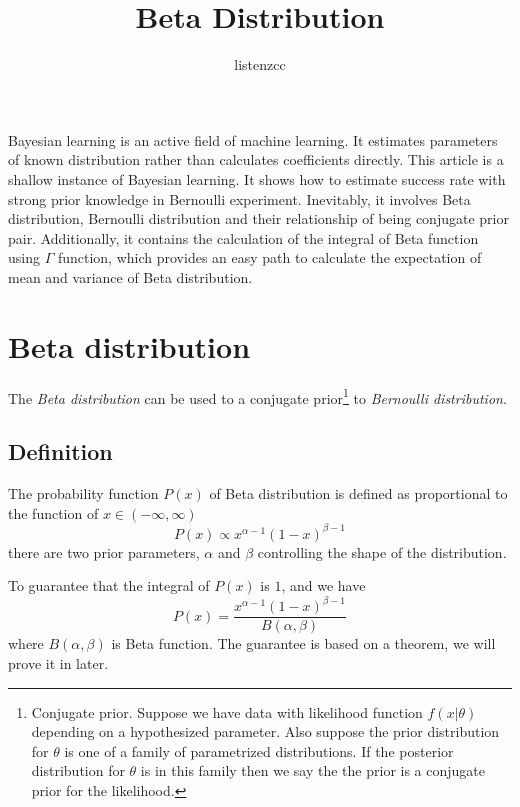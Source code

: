 \documentclass[a4paper]{article}
\title{Beta Distribution}
\author{listenzcc}
\begin{document}
\maketitle

\abstract
Bayesian learning is an active field of machine learning.
It estimates parameters of known distribution rather than calculates coefficients directly.
This article is a shallow instance of Bayesian learning.
It shows how to estimate success rate with strong prior knowledge in Bernoulli experiment.
Inevitably, it involves Beta distribution, Bernoulli distribution and their relationship of being conjugate prior pair.
Additionally, it contains the calculation of the integral of Beta function using $\Gamma$ function, which provides an easy path to calculate the expectation of mean and variance of Beta distribution.

\tableofcontents

\section{Beta distribution}
The \emph{Beta distribution} can be used to a conjugate prior\footnote{Conjugate prior. Suppose we have data with likelihood function $f(x|\theta)$ depending on a hypothesized parameter. Also suppose the prior distribution for $\theta$ is one of a family of parametrized distributions. If the posterior distribution for $\theta$ is in this family then we say the the prior is a conjugate prior for the likelihood.} to \emph{Bernoulli distribution}.

\subsection{Definition}
The probability function $P(x)$ of Beta distribution is defined as proportional to the function of $x \in (-\infty, \infty)$
\begin{equation}
    P(x) \propto x^{\alpha-1} (1-x)^{\beta-1}
\end{equation}
there are two prior parameters, $\alpha$ and $\beta$ controlling the shape of the distribution.

To guarantee that the integral of $P(x)$ is $1$, and we have
\begin{equation}
    P(x) = \frac{x^{\alpha-1} (1-x)^{\beta-1}}{B(\alpha, \beta)}
\end{equation}
where $B(\alpha, \beta)$ is Beta function.
The guarantee is based on a theorem, we will prove it in later.
\end{document}

